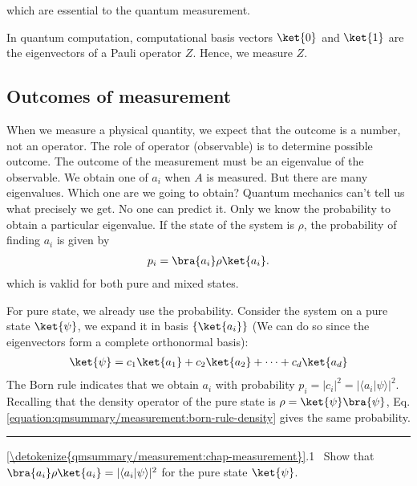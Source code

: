 \documentclass[letterpaper,10pt,english]{jupyterBook}
\begin{document}
\sphinxAtStartPar
which are essential to the quantum measurement.

\sphinxAtStartPar
In quantum computation,  computational basis vectors \(\ket{0}\) and \(\ket{1}\) are the eigenvectors of a Pauli operator \(Z\).  Hence, we measure \(Z\).


\subsection{Outcomes of measurement}
\label{\detokenize{qmsummary/measurement:outcomes-of-measurement}}
\sphinxAtStartPar
When we measure a physical quantity, we expect that the outcome is a number, not an operator.  The role of operator (observable) is to determine possible outcome.  The outcome of the measurement must be an eigenvalue of the observable.  We obtain one of \(a_i\) when \(A\) is measured.  But there are many eigenvalues.  Which one are we going to obtain?   Quantum mechanics can’t tell us what precisely we get.  No one can predict it. Only we know the probability to obtain a particular eigenvalue.   If the state of the system is \(\rho\), the probability of finding \(a_i\) is given by
\begin{equation}\label{equation:qmsummary/measurement:born-rule-density}
\begin{split}
p_i = \bra{a_i} \rho \ket{a_i}.
\end{split}
\end{equation}
\sphinxAtStartPar
which is vaklid for both pure and mixed states.

\sphinxAtStartPar
For pure state, we already use the probability.  Consider the system on a pure state \(\ket{\psi}\), we expand it in basis \(\{\ket{a_i}\}\) (We can do so since the eigenvectors form a complete orthonormal basis):
\begin{equation*}
\begin{split}
\ket{\psi} = c_1 \ket{a_1} + c_2 \ket{a_2} + \cdots + c_d \ket{a_d}
\end{split}
\end{equation*}
\sphinxAtStartPar
The Born rule indicates that we obtain \(a_i\)  with probability \(p_i= |c_i|^2 = |\langle a_i | \psi \rangle |^2\).  Recalling that the density operator of  the pure state is \(\rho = \ket{\psi}\bra{\psi}\), Eq. \eqref{equation:qmsummary/measurement:born-rule-density} gives the same probability.


\bigskip\hrule\bigskip


\sphinxAtStartPar
{}  \hyperref[\detokenize{qmsummary/measurement:chap-measurement}]{\ref{\detokenize{qmsummary/measurement:chap-measurement}}}.1   Show that \(\bra{a_i} \rho \ket{a_i} =  |\langle a_i | \psi \rangle |^2\) for the pure state \(\ket{\psi}\).
\end{document}
